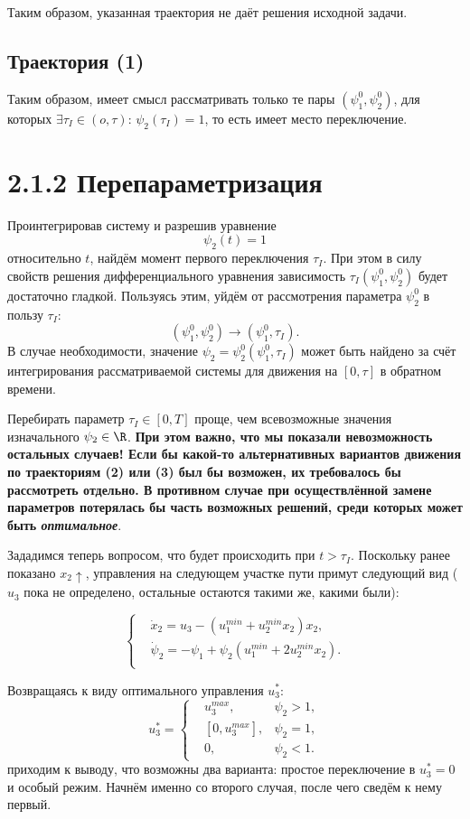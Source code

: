 Таким образом, указанная траектория не даёт решения исходной задачи.

\subsection*{Траектория (1)}
Таким образом, имеет смысл рассматривать только те пары $(\psi_1^0, \psi_2^0)$, для которых $\exists \tau_I \in (o, \tau)$: $\psi_2(\tau_I) = 1$, то есть имеет место переключение.

\section*{2.1.2 Перепараметризация}
Проинтегрировав систему и разрешив уравнение
$$
    \psi_2(t) = 1
$$
относительно $t$, найдём момент первого переключения $\tau_I$. При этом в силу свойств решения дифференциального уравнения зависимость $\tau_I(\psi_1^0, \psi_2^0)$ будет достаточно гладкой. Пользуясь этим, уйдём от рассмотрения параметра $\psi_2^0$ в пользу $\tau_I$:
$$
(\psi_1^0, \psi_2^0) \rightarrow (\psi_1^0, \tau_I).
$$
В случае необходимости, значение $\psi_2 = \psi_2^0(\psi_1^0, \tau_I)$ может быть найдено за счёт интегрирования рассматриваемой системы для движения на $[0, \tau]$ в обратном времени.

Перебирать параметр $\tau_I \in [0, T]$ проще, чем всевозможные значения изначального $\psi_2 \in \R$. \textbf{При этом важно, что мы показали невозможность остальных случаев! Если бы какой-то альтернативных вариантов движения по траекториям (2) или (3) был бы возможен, их требовалось бы рассмотреть отдельно. В противном случае при осуществлённой замене параметров потерялась бы часть возможных решений, среди которых может быть \textit{оптимальное}}.

Зададимся теперь вопросом, что будет происходить при $t > \tau_I$. Поскольку ранее показано $x_2 \uparrow$, управления на следующем участке пути примут следующий вид ($u_3$ пока не определено, остальные остаются такими же, какими были):

$$
    \left\{
    \begin{aligned}
        & \dot{x}_2 = u_3 - (u_1^{min} + u_2^{min} x_2) x_2, \\
        & \dot{\psi}_2 = - \psi_1 + \psi_2 (u_1^{min} + 2 u_2^{min} x_2). \\
    \end{aligned}
    \right.
$$

Возвращаясь к виду оптимального управления $u_3^*$:
$$
    u_3^* = \left\{ \begin{aligned}
        & u_3^{max}, &\psi_2 > 1, \\
        & [0, u_3^{max}], &\psi_2 = 1, \\
        & 0, &\psi_2 < 1.
    \end{aligned} \right.
$$
приходим к выводу, что возможны два варианта: простое переключение в $u_3^* = 0$ и особый режим. Начнём именно со второго случая, после чего сведём к нему первый.

